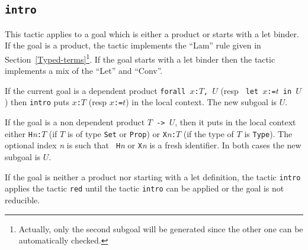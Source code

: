 \begin{ErrMsgs}

\item {}

\item {}

\end{ErrMsgs}

\subsection{\tt intro
\label{intro}}

This tactic applies to a goal which is either a product or starts with
a let binder. If the goal is a product, the tactic implements the
``Lam'' rule given in
Section~\ref{Typed-terms}\footnote{Actually, only the second subgoal will be
generated since the other one can be automatically checked.}.  If the
goal starts with a let binder then the tactic implements a mix of the
``Let'' and ``Conv''.

If the current goal is a dependent product {\tt forall $x$:$T$, $U$} (resp {\tt
let $x$:=$t$ in $U$}) then {\tt intro} puts {\tt $x$:$T$} (resp {\tt $x$:=$t$})
 in the local context.
The new subgoal is $U$.

If the goal is a non dependent product {\tt $T$ -> $U$}, then it puts
in the local context either {\tt H}{\it n}{\tt :$T$} (if $T$ is of
type {\tt Set} or {\tt Prop}) or {\tt X}{\it n}{\tt :$T$} (if the type
of $T$ is {\tt Type}). The optional index {\it n} is such that {\tt
H}{\it n} or {\tt X}{\it n} is a fresh identifier.
In both cases the new subgoal is $U$.

If the goal is neither a product nor starting with a let definition,
the tactic {\tt intro} applies the tactic {\tt red} until the tactic
{\tt intro} can be applied or the goal is not reducible.

\begin{ErrMsgs}
\item {}
\item {}
\end{ErrMsgs}

